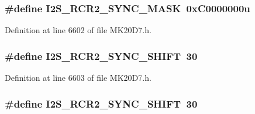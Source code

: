 \subsubsection[{\texorpdfstring{I2\+S\+\_\+\+R\+C\+R2\+\_\+\+S\+Y\+N\+C\+\_\+\+M\+A\+SK}{I2S_RCR2_SYNC_MASK}}]{\setlength{\rightskip}{0pt plus 5cm}\#define I2\+S\+\_\+\+R\+C\+R2\+\_\+\+S\+Y\+N\+C\+\_\+\+M\+A\+SK~0x\+C0000000u}\hypertarget{group___i2_s___register___masks_gaf1a919e7fd69cca38a1454b2883fc0f0}{}\label{group___i2_s___register___masks_gaf1a919e7fd69cca38a1454b2883fc0f0}


Definition at line 6602 of file M\+K20\+D7.\+h.

\subsubsection[{\texorpdfstring{I2\+S\+\_\+\+R\+C\+R2\+\_\+\+S\+Y\+N\+C\+\_\+\+S\+H\+I\+FT}{I2S_RCR2_SYNC_SHIFT}}]{\setlength{\rightskip}{0pt plus 5cm}\#define I2\+S\+\_\+\+R\+C\+R2\+\_\+\+S\+Y\+N\+C\+\_\+\+S\+H\+I\+FT~30}\hypertarget{group___i2_s___register___masks_ga9bb530a10a74f4c58a1866ba1d62fedd}{}\label{group___i2_s___register___masks_ga9bb530a10a74f4c58a1866ba1d62fedd}


Definition at line 6603 of file M\+K20\+D7.\+h.

\subsubsection[{\texorpdfstring{I2\+S\+\_\+\+R\+C\+R2\+\_\+\+S\+Y\+N\+C\+\_\+\+S\+H\+I\+FT}{I2S_RCR2_SYNC_SHIFT}}]{\setlength{\rightskip}{0pt plus 5cm}\#define I2\+S\+\_\+\+R\+C\+R2\+\_\+\+S\+Y\+N\+C\+\_\+\+S\+H\+I\+FT~30}\hypertarget{group___i2_s___register___masks_ga9bb530a10a74f4c58a1866ba1d62fedd}{}\label{group___i2_s___register___masks_ga9bb530a10a74f4c58a1866ba1d62fedd}


